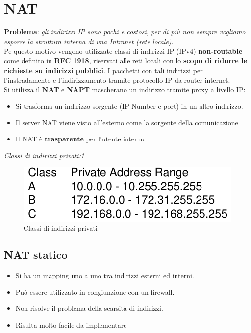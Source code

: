\documentclass[12pt]{article}
\begin{document}
	\section{NAT}
		\textbf{Problema}: \textit{gli indirizzi IP sono pochi e costosi, per di più non sempre vogliamo esporre la struttura interna di una Intranet (rete locale)}.\\
		Pe questo motivo vengono utilizzate classi di indirizzi IP (IPv4) \textbf{non-routable} come definito in \textbf{RFC 1918}, riservati alle reti locali con lo \textbf{scopo di ridurre le richieste su indirizzi pubblici}. I pacchetti con tali indirizzi per l'instradamento e l'indirizzamento tramite protocollo IP da router internet.\\
		Si utilizza il \textbf{NAT} e \textbf{NAPT} mascherano un indirizzo tramite proxy a livello IP:
		\begin{itemize}
			\item Si trasforma un indirizzo sorgente (IP Number e port) in un altro indirizzo.
			\item Il server NAT viene visto all'esterno come la sorgente della comunicazione
			\item Il NAT è \textbf{trasparente} per l'utente interno 
		\end{itemize}
		
		\textit{Classi di indirizzi privati:\ref{fig:1}}
		\begin{figure}[h!]
			\centering
			\includegraphics[scale=0.40]{img/class.PNG}
			\caption{Classi di indirizzi privati\label{fig:1}}
		\end{figure}
		
		\subsection{NAT statico}
			\begin{itemize}
				\item Si ha un mapping uno a uno tra indirizzi esterni ed interni.
				\item Può essere utilizzato in congiunzione con un firewall.
				\item Non risolve il problema della scarsità di indirizzi.
				\item Risulta molto facile da implementare	
			\end{itemize}
		
\end{document}
